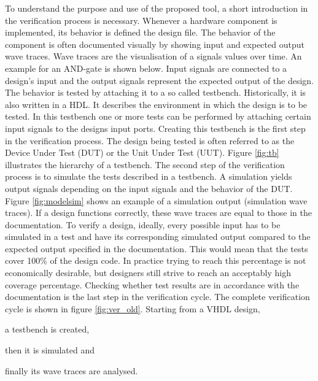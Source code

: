 \npar
To understand the purpose and use of the proposed tool, a short introduction in the verification process is necessary.
\newpage\noindent
Whenever a hardware component is implemented, its behavior is defined the design file. The behavior of the component is often documented visually by showing input and expected output wave traces. Wave traces are the visualisation of a signals values over time. An example for an AND-gate is shown below. Input signals are connected to a design's input and the output signals represent the expected output of the design.\nline
{}\nline
The behavior is tested by attaching it to a so called testbench.  Historically, it is also written in a HDL. It describes the environment in which the design is to be tested. In this testbench one or more tests can be performed by attaching certain input signals to the designs input ports. Creating this testbench is the first step in the verification process. The design being tested is often referred to as the Device Under Test (DUT) or the Unit Under Test (UUT). Figure \ref{fig:tb} illustrates the hierarchy of a testbench.
\nline
The second step of the verification process is to simulate the tests described in a testbench. A simulation yields output signals depending on the input signals and the behavior of the DUT. Figure \ref{fig:modelsim} shows an example of a simulation output (simulation wave traces). If a design functions correctly, these wave traces are equal to those in the documentation.
\nline
To verify a design, ideally,  every possible input has to be simulated in a test and have its corresponding simulated output compared to the expected output specified in the documentation. This would mean that the tests cover 100\% of the design code. In practice trying to reach this percentage is not economically desirable, but designers still strive to reach an acceptably high coverage percentage. Checking whether test results are in accordance with the documentation is the last step in the verification cycle.
\npar
The complete verification cycle is shown in figure \ref{fig:ver_old}. Starting from  a VHDL design,
\begin{inparaenum}[a)]
	\item a testbench is created, 
	\item then it is simulated and
	\item finally its wave traces are analysed.
\end{inparaenum}
